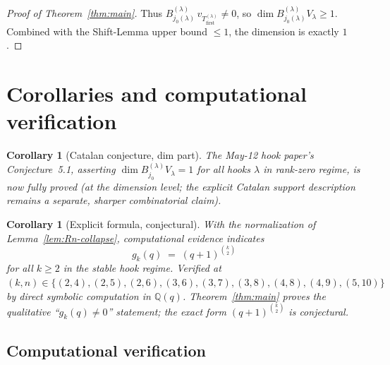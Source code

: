 \documentclass[11pt]{article}
\newtheorem{corollary}[theorem]{Corollary}
\theoremstyle{definition}
\begin{document}
\begin{proof}[Proof of Theorem~\ref{thm:main}]
Thus $B^{(\lambda)}_{j_0(\lambda)}\,v_{T_{\mathrm{first}}^{(\lambda)}} \ne 0$,
so $\dim B^{(\lambda)}_{j_0(\lambda)} V_\lambda \ge 1$.  Combined with
the Shift-Lemma upper bound $\le 1$, the dimension is exactly $1$.
\end{proof}

\section{Corollaries and computational verification}\label{sec:consequences}

\begin{corollary}[Catalan conjecture, dim part]\label{cor:catalan-dim}
The May-12 hook paper's Conjecture~5.1, asserting $\dim B^{(\lambda)}_{j_0}
V_\lambda = 1$ for all hooks $\lambda$ in rank-zero regime, is now
fully proved (at the dimension level; the explicit Catalan support
description remains a separate, sharper combinatorial claim).
\end{corollary}

\begin{corollary}[Explicit formula, conjectural]\label{cor:explicit-formula}
With the normalization of Lemma~\ref{lem:Rn-collapse}, computational
evidence indicates
\[
    g_k(q) \;=\; (q+1)^{\binom{k}{2}}
\]
for all $k \ge 2$ in the stable hook regime.  Verified at
$(k, n) \in \{(2, 4), (2, 5), (2, 6), (3, 6), (3, 7), (3, 8), (4, 8),
(4, 9), (5, 10)\}$ by direct symbolic computation in $\mathbb{Q}(q)$.
Theorem~\ref{thm:main} proves the qualitative
``$g_k(q) \ne 0$'' statement; the exact form
$(q+1)^{\binom{k}{2}}$ is conjectural.
\end{corollary}

\subsection{Computational verification}
\end{document}
